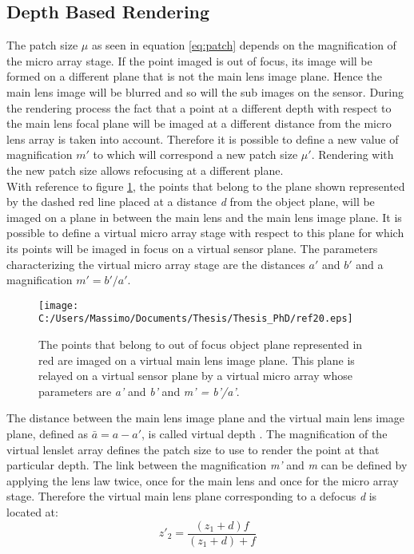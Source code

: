 \subsection{Depth Based Rendering}
\label{sec:depthbased}
The patch size $\mu$ as seen in equation \ref{eq:patch} depends on the magnification of the micro array stage. If the point imaged is out of focus, its image will be formed on a different plane that is not the main lens image plane. Hence the main lens image will be blurred and so will the sub images on the sensor. During the rendering process the fact that a point at a different depth with respect to the main lens focal plane will be imaged at a different distance from the micro lens array is taken into account. Therefore it is possible to define a new value of magnification $m'$ to which will correspond a new patch size $\mu'$.
Rendering with the new patch size allows refocusing at a different plane.\\
 With reference to figure \ref{fig:def20}, the points that belong to the plane shown represented by the dashed red line placed at a distance \textit{d} from the object plane, will be imaged on a plane in between the main lens and the main lens image plane. It is possible to define a virtual micro array stage with respect to this plane for which its points will be imaged in focus on a virtual sensor plane. The parameters characterizing the virtual micro array stage are the distances $a' $ and $b' $ and a magnification $m' = b'/a'$.
\begin{figure}[H]
	\centering
	\texttt{[image: C:/Users/Massimo/Documents/Thesis/Thesis\_PhD/ref20.eps]}
	\caption{\label{fig:def20} The points that belong to out of focus object plane represented in red are imaged on a virtual main lens image plane. This plane is relayed on a virtual sensor plane by a virtual micro array whose parameters are  \textit{a'} and \textit{b'} and \textit{m' = b'/a'}. }
\end{figure}
The distance between the main lens image plane and the virtual main lens image plane, defined as \textit{$\bar{a} = a-a'$}, is called virtual depth \cite{perwass2012single}. The magnification of the virtual lenslet array defines the patch size to use to render the point at that particular depth. The link between the magnification \textit{m'} and \textit{m} can be defined by applying the lens law twice, once for the main lens and once for the micro array stage.
Therefore the virtual main lens plane corresponding to a defocus \textit{d} is located at:
\begin{equation}
	\label{eq:def201}
	z'_2 = \dfrac{(z_1+d)f}{(z_1+d)+f}
\end{equation}
